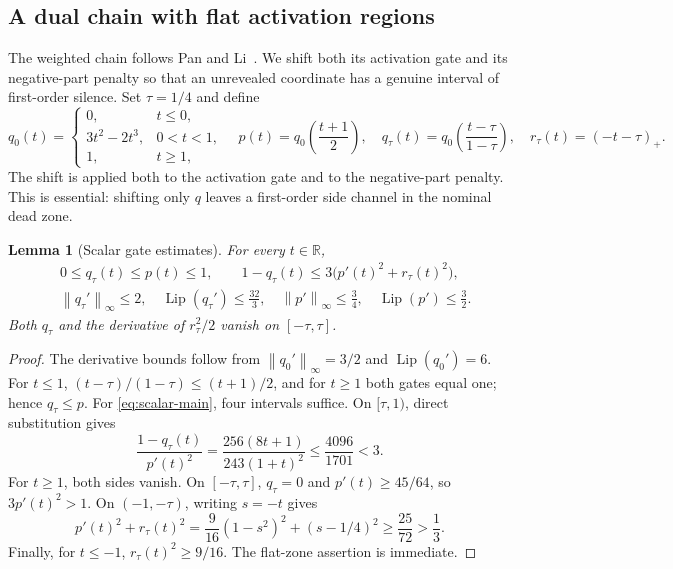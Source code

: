 \documentclass[11pt,a4paper]{article}
\newcommand{\R}{\mathbb R}
\newcommand{\norm}[1]{\left\lVert #1\right\rVert}
\newcommand{\Lip}{\operatorname{Lip}}
\newtheorem{lemma}[theorem]{Lemma}
\theoremstyle{definition}
\theoremstyle{remark}
\numberwithin{equation}{section}
\begin{document}
\subsection{A dual chain with flat activation regions}
\label{sec:robust-chain}

The weighted chain follows Pan and Li~\cite{panli}. We shift both its
activation gate and its negative-part penalty so that an unrevealed
coordinate has a genuine interval of first-order silence. Set $\tau=1/4$
and define
\[
 q_0(t)=
 \begin{cases}
 0,&t\le0,\\
 3t^2-2t^3,&0<t<1,\\
 1,&t\ge1,
 \end{cases}
 \quad
 p(t)=q_0\!\left(\frac{t+1}{2}\right),
 \quad
 q_\tau(t)=q_0\!\left(\frac{t-\tau}{1-\tau}\right),
 \quad
 r_\tau(t)=(-t-\tau)_+.
 \label{eq:gates-def}
\]
The shift is applied both to the activation gate and to the negative-part penalty.  This is essential: shifting only $q$ leaves a first-order side channel in the nominal dead zone.

\begin{lemma}[Scalar gate estimates]
\label{lem:scalar-ledger}
For every $t\in\R$,
\begin{align}
 &0\le q_\tau(t)\le p(t)\le1,
 \qquad
 1-q_\tau(t)\le3\bigl(p'(t)^2+r_\tau(t)^2\bigr),
 \label{eq:scalar-main}\\
 &\norm{q_\tau'}_\infty\le2,
 \quad \Lip(q_\tau')\le\frac{32}{3},
 \quad \norm{p'}_\infty\le\frac34,
 \quad \Lip(p')\le\frac32.
 \label{eq:scalar-derivs}
\end{align}
Both $q_\tau$ and the derivative of $r_\tau^2/2$ vanish on $[-\tau,\tau]$.
\end{lemma}

\begin{proof}
The derivative bounds follow from $\norm{q_0'}_\infty=3/2$ and $\Lip(q_0')=6$.  For $t\le1$,
$(t-\tau)/(1-\tau)\le(t+1)/2$, and for $t\ge1$ both gates equal one; hence $q_\tau\le p$.
For \eqref{eq:scalar-main}, four intervals suffice.  On $[\tau,1)$, direct substitution gives
\[
 \frac{1-q_\tau(t)}{p'(t)^2}
 =\frac{256(8t+1)}{243(1+t)^2}\le\frac{4096}{1701}<3.
\]
For $t\ge1$, both sides vanish. On $[-\tau,\tau]$, $q_\tau=0$ and $p'(t)\ge45/64$, so $3p'(t)^2>1$.
On $(-1,-\tau)$, writing $s=-t$ gives
\[
 p'(t)^2+r_\tau(t)^2
 =\frac9{16}(1-s^2)^2+(s-1/4)^2\ge\frac{25}{72}>\frac13.
\]
Finally, for $t\le-1$, $r_\tau(t)^2\ge9/16$.  The flat-zone assertion is immediate.
\end{proof}
\end{document}
